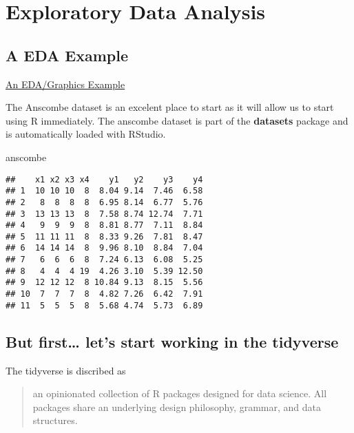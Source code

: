 \documentclass[]{book}
\newenvironment{Shaded}{\begin{snugshade}}{\end{snugshade}}
\newcommand{\NormalTok}[1]{#1}
\theoremstyle{definition}
\theoremstyle{definition}
\theoremstyle{definition}
\theoremstyle{remark}
\begin{document}
\hypertarget{EDA}{%
\chapter{Exploratory Data Analysis}\label{EDA}}

\hypertarget{a-eda-example}{%
\section{A EDA Example}\label{a-eda-example}}

\href{https://www.itl.nist.gov/div898/handbook/eda/section1/eda16.htm}{An
EDA/Graphics Example}

The Anscombe dataset is an excelent place to start as it will allow us
to start using R immediately. The anscombe dataset is part of the
\textbf{datasets} package and is automatically loaded with RStudio.

\begin{Shaded}
\begin{Highlighting}[]
\NormalTok{anscombe}
\end{Highlighting}
\end{Shaded}

\begin{verbatim}
##    x1 x2 x3 x4    y1   y2    y3    y4
## 1  10 10 10  8  8.04 9.14  7.46  6.58
## 2   8  8  8  8  6.95 8.14  6.77  5.76
## 3  13 13 13  8  7.58 8.74 12.74  7.71
## 4   9  9  9  8  8.81 8.77  7.11  8.84
## 5  11 11 11  8  8.33 9.26  7.81  8.47
## 6  14 14 14  8  9.96 8.10  8.84  7.04
## 7   6  6  6  8  7.24 6.13  6.08  5.25
## 8   4  4  4 19  4.26 3.10  5.39 12.50
## 9  12 12 12  8 10.84 9.13  8.15  5.56
## 10  7  7  7  8  4.82 7.26  6.42  7.91
## 11  5  5  5  8  5.68 4.74  5.73  6.89
\end{verbatim}

\hypertarget{but-first-lets-start-working-in-the-tidyverse}{%
\section{But first\ldots{} let's start working in the
tidyverse}\label{but-first-lets-start-working-in-the-tidyverse}}

The tidyverse is discribed as

\begin{quote}
an opinionated collection of R packages designed for data science. All
packages share an underlying design philosophy, grammar, and data
structures.
\end{quote}
\end{document}
